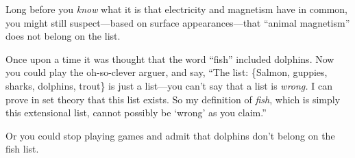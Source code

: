 {%




 Long before you \textit{know} what it is that electricity and
magnetism have in common, you might still suspect---based on surface
appearances---that ``animal
magnetism'' does not belong on the list.


 Once upon a time it was thought that the word
``fish'' included dolphins. Now you
could play the oh-so-clever arguer, and say, ``The
list: \{Salmon, guppies, sharks,
dolphins, trout\} is just a
list---you can't say that a list is \textit{wrong.} I
can prove in set theory that this list exists. So my definition of
\textit{fish}, which is simply this extensional list, cannot possibly
be `wrong' as you
claim.''


 Or you could stop playing games and admit that dolphins
don't belong on the fish list.


}
